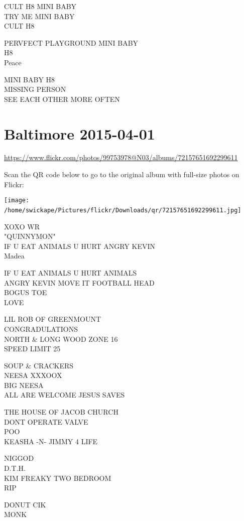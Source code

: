 \documentclass[10pt,letterpaper]{article}
\begin{document}
CULT H8 MINI BABY\\
TRY ME MINI BABY\\
CULT H8

PERVFECT PLAYGROUND MINI BABY\\
H8\\
Peace

MINI BABY H8\\
MISSING PERSON\\
SEE EACH OTHER MORE OFTEN
\

\section*{Baltimore 2015-04-01}

\url{https://www.flickr.com/photos/99753978@N03/albums/72157651692299611}

Scan the QR code below to go to the original album with full-size photos on Flickr:

\texttt{[image: /home/swickape/Pictures/flickr/Downloads/qr/72157651692299611.jpg]}
\

XOXO WR\\
"QUINNYMON"\\
IF U EAT ANIMALS U HURT ANGRY KEVIN\\
Madea

IF U EAT ANIMALS U HURT ANIMALS\\
ANGRY KEVIN MOVE IT FOOTBALL HEAD\\
BOGUS TOE\\
LOVE

LIL ROB OF GREENMOUNT\\
CONGRADULATIONS\\
NORTH \& LONG WOOD ZONE 16\\
SPEED LIMIT 25

SOUP \& CRACKERS\\
NEESA XXXOOX\\
BIG NEESA\\
ALL ARE WELCOME JESUS SAVES

THE HOUSE OF JACOB CHURCH\\
DONT OPERATE VALVE\\
POO\\
KEASHA {-}N{-} JIMMY 4 LIFE

NIGGOD\\
D.T.H.\\
KIM FREAKY TWO BEDROOM\\
RIP

DONUT CIK\\
MONK
\
\end{document}
